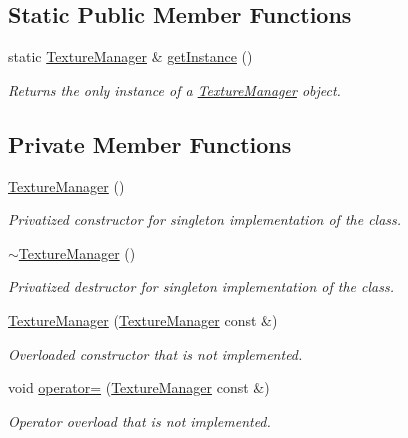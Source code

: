 \subsection*{Static Public Member Functions}
\begin{DoxyCompactItemize}
\item 
static \hyperlink{class_texture_manager}{Texture\+Manager} \& \hyperlink{class_texture_manager_a0a6bc63e2f6fa7e1d0aee5b24cfa089a}{get\+Instance} ()
\begin{DoxyCompactList}\small\item\em Returns the only instance of a \hyperlink{class_texture_manager}{Texture\+Manager} object. \end{DoxyCompactList}\end{DoxyCompactItemize}
\subsection*{Private Member Functions}
\begin{DoxyCompactItemize}
\item 
\hyperlink{class_texture_manager_ad76abb178b37cedf4514eb0154349935}{Texture\+Manager} ()
\begin{DoxyCompactList}\small\item\em Privatized constructor for singleton implementation of the class. \end{DoxyCompactList}\item 
\hyperlink{class_texture_manager_a001d6d74674961db79987e3222682576}{$\sim$\+Texture\+Manager} ()
\begin{DoxyCompactList}\small\item\em Privatized destructor for singleton implementation of the class. \end{DoxyCompactList}\item 
\hyperlink{class_texture_manager_a66ddaf848b4dd3f75e3c311af536ebe4}{Texture\+Manager} (\hyperlink{class_texture_manager}{Texture\+Manager} const \&)
\begin{DoxyCompactList}\small\item\em Overloaded constructor that is not implemented. \end{DoxyCompactList}\item 
void \hyperlink{class_texture_manager_ac39a48038aa63007dd02f0c53ecc77eb}{operator=} (\hyperlink{class_texture_manager}{Texture\+Manager} const \&)
\begin{DoxyCompactList}\small\item\em Operator overload that is not implemented. \end{DoxyCompactList}\end{DoxyCompactItemize}
